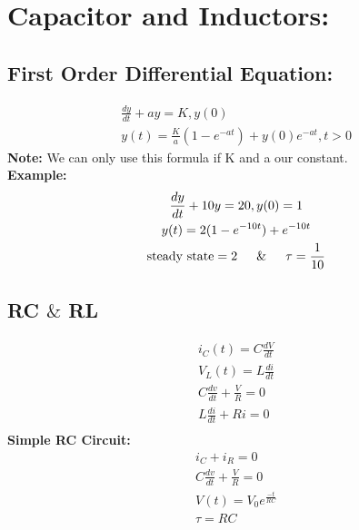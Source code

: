 \documentclass[a4paper,12]{article}
\begin{document}
\section{Capacitor and Inductors:}
\subsection{First Order Differential Equation: }
\begin{gather}
    \frac{dy}{dt}+ay=K,y(0)\\
    y(t)=\frac{K}{a}(1-e^{-at})+y(0)e^{-at}, t>0
\end{gather}
\textbf{Note:} We can only use this formula if K and a our constant.\\

\textbf{Example:}\\
\setcounter{equation}{0}
\begin{gather}
    \frac{dy}{dt}+10y=20,y(0)=1\\
    y(t)=2(1-e^{-10t})+e^{-10t}\\
    \text{steady state}=2 \indent \& \indent \tau=\frac{1}{10}
\end{gather}

\subsection{RC $\&$  RL}
\begin{gather}
i_C(t)=C\frac{dV}{dt}\\
V_L(t)=L\frac{di}{dt}\\
C\frac{dv}{dt}+\frac{V}{R}=0\\
L\frac{di}{dt}+Ri=0\\
\end{gather}
  \textbf{Simple RC Circuit:}\\
        \begin{gather}
        i_C+i_R=0\\
        C\frac{dv}{dt}+\frac{V}{R}=0\\
        V(t)=V_0e^{\frac{-t}{RC}}\\
        \tau=RC
        \end{gather}
  
\end{document}
